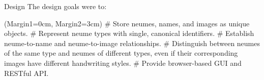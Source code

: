 \documentclass[final]{beamer}
\newlength{\onecolwid}
\begin{document}
\begin{frame}[fragile,t]
\begin{columns}
\begin{column}{\onecolwid}
\begin{block}{Design}
The design goals were to:

\begin{easylist}[itemize]
\ListProperties(Margin1=0cm, Margin2=3cm)
# Store neumes, names, and images as unique objects.
# Represent neume types with single, canonical identifiers.
# Establish neume-to-name and neume-to-image relationships.
# Distinguish between neumes of the same type and neumes of different types, even if their corresponding images have different handwriting styles.
# Provide browser-based GUI and RESTful API.
\end{easylist}



\vspace{-1.6cm}


\end{block}
\end{column}
\end{columns}
\end{frame}
\end{document}
